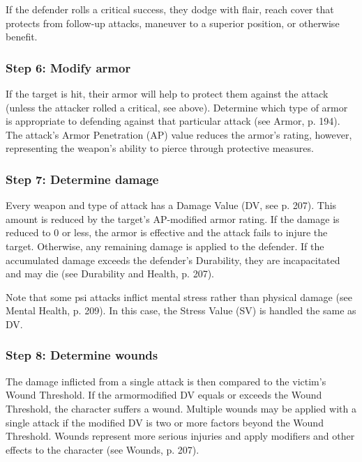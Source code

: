 If the defender rolls a critical success, they dodge with flair, reach cover that protects from follow-up attacks, maneuver to a superior position, or otherwise benefit. 

\subsubsection{Step 6: Modify armor} 

If the target is hit, their armor will help to protect them against the attack (unless the attacker rolled a critical, see above). Determine which type of armor is appropriate to defending against that particular attack (see Armor, p. 194). The attack’s Armor Penetration (AP) value reduces the armor’s rating, however, representing the weapon’s ability to pierce through protective measures. 

\subsubsection{Step 7: Determine damage} 

Every weapon and type of attack has a Damage Value (DV, see p. 207). This amount is reduced by the target’s AP-modified armor rating. If the damage is reduced to 0 or less, the armor is effective and the attack fails to injure the target. Otherwise, any remaining damage is applied to the defender. If the accumulated damage exceeds the defender’s Durability, they are incapacitated and may die (see Durability and Health, p. 207). 

Note that some psi attacks inflict mental stress rather than physical damage (see Mental Health, p. 209). In this case, the Stress Value (SV) is handled the same as DV. 

\subsubsection{Step 8: Determine wounds} 

The damage inflicted from a single attack is then compared to the victim’s Wound Threshold. If the armormodified DV equals or exceeds the Wound Threshold, the character suffers a wound. Multiple wounds may be applied with a single attack if the modified DV is two or more factors beyond the Wound Threshold. Wounds represent more serious injuries and apply modifiers and other effects to the character (see Wounds, p. 207). 

